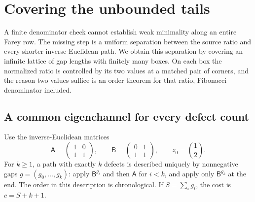 \section{Covering the unbounded tails}
\label{sec:tails}

A finite denominator check cannot establish weak minimality along an entire
Farey row. The missing step is a uniform separation between the source
ratio and every shorter inverse-Euclidean path. We obtain this separation
by covering an infinite lattice of gap lengths with finitely many boxes.
On each box the normalized ratio is controlled by its two values at a
matched pair of corners, and the reason two values suffice is an order
theorem for that ratio, Fibonacci denominator included.

\subsection{A common eigenchannel for every defect count}

Use the inverse-Euclidean matrices
$$
 \mathsf A=\begin{pmatrix}1&0\\1&1\end{pmatrix},\qquad
 \mathsf B=\begin{pmatrix}0&1\\1&1\end{pmatrix},\qquad z_0=\binom12.
$$
For $k\geqslant1$, a path with exactly $k$ defects is described uniquely
by nonnegative gaps $g=(g_0,\ldots,g_k)$: apply $\mathsf B^{g_i}$ and
then $\mathsf A$ for $i<k$, and apply only $\mathsf B^{g_k}$ at the end.
The order in this description is chronological. If $S=\sum_i g_i$, the
cost is $c=S+k+1$.

